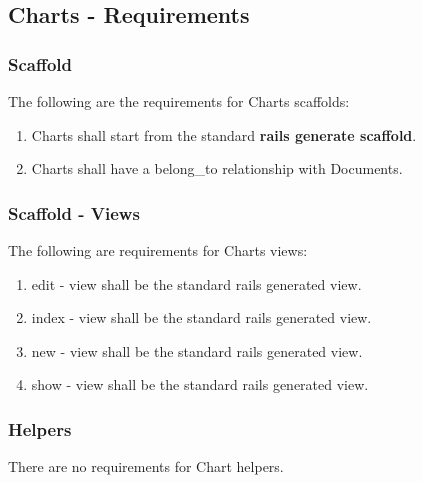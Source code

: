 \subsection{Charts - Requirements}
\label{sec:document_spec} 

\subsubsection{Scaffold}
The following are the requirements for Charts scaffolds:
\begin{enumerate}
	\item Charts shall start from the standard \textbf{rails generate scaffold}.
	\item Charts shall have a belong\_to relationship with Documents.
\end{enumerate}

\subsubsection{Scaffold - Views}
The following are requirements for Charts views:
\begin{enumerate}

	\item edit - view shall be the standard rails generated view. 

	\item index - view shall be the standard rails generated view. 
	
	\item new - view shall be the standard rails generated view. 
	
	\item show - view shall be the standard rails generated view. 

\end{enumerate}


\subsubsection{Helpers}
There are no requirements for Chart helpers.
